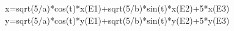 x=sqrt(5/a)*cos(t)*x(E1)+sqrt(5/b)*sin(t)*x(E2)+5*x(E3)
y=sqrt(5/a)*cos(t)*y(E1)+sqrt(5/b)*sin(t)*y(E2)+5*y(E3)